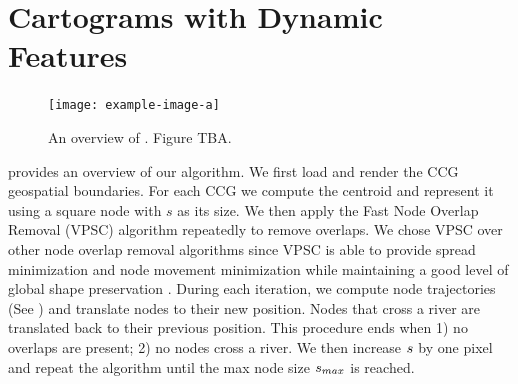 \section{Cartograms with Dynamic Features}

{
\begin{figure}[b!]
    \centering
    \texttt{[image: example-image-a]}
    \caption{An overview of \software. Figure TBA.}
    \label{fig:overview}
\end{figure}
}

 provides an overview of our algorithm. We first load and render the CCG geospatial boundaries. For each CCG we compute the centroid and represent it using a square node with $ s $ as its size. We then apply the Fast Node Overlap Removal (VPSC) algorithm \cite{dwyer2006fast} repeatedly to remove overlaps. We chose VPSC over other node overlap removal algorithms since VPSC is able to provide spread minimization and node movement minimization while maintaining a good level of global shape preservation \cite{chen2020Node}. During each iteration, we compute node trajectories (See ) and translate nodes to their new position. Nodes that cross a river are translated back to their previous position. This procedure ends when 1) no overlaps are present; 2) no nodes cross a river. We then increase $ s $ by one pixel and repeat the algorithm until the max node size $ s_{max} $ is reached.


